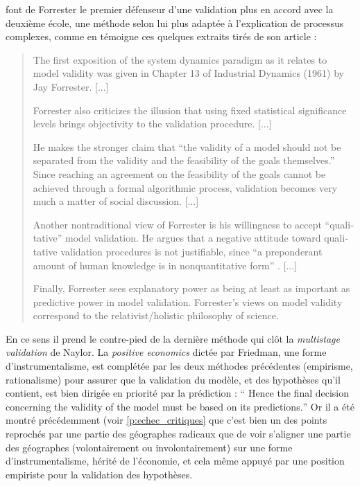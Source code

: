 \textcite{Barlas1990} font de Forrester le premier défenseur d'une validation plus en accord avec la deuxième école, une méthode selon lui plus adaptée à l'explication de processus complexes, comme en témoigne ces quelques extraits tirés de son article :

\foreignblockquote{english}[\cite{Barlas1990}]{The first exposition of the system dynamics paradigm as it relates to model validity was given in Chapter 13 of Industrial Dynamics (1961) by Jay Forrester. [...]

Forrester also criticizes the illusion that using fixed statistical significance levels brings objectivity to the validation procedure. [...]

He makes the stronger claim that \foreignquote{english}{the validity of a model should not be separated from the validity and the feasibility of the goals themselves.} Since reaching an agreement on the feasibility of the goals cannot be achieved through a formal algorithmic process, validation becomes very much a matter of social discussion. [...]

Another nontraditional view of Forrester is his willingness to accept \foreignquote{english}{qualitative} model validation. He argues that a negative attitude toward qualitative validation procedures is not justifiable, since \foreignquote{english}{a preponderant amount of human knowledge is in nonquantitative form} \autocite[128]{Forrester1961}. [...]

Finally, Forrester sees explanatory power as being at least as important as predictive power in model validation. Forrester’s views on model validity correspond to the relativist/holistic philosophy of science. }

En ce sens il prend le contre-pied de la dernière méthode qui clôt la \textit{multistage validation} de Naylor. La \textit{positive economics} dictée par Friedman, une forme d'instrumentalisme, est complétée par les deux méthodes précédentes (empirisme, rationalisme) pour assurer que la validation du modèle, et des hypothèses qu'il contient, est bien dirigée en priorité par la prédiction : \foreignquote{english}{ Hence the final decision concerning the validity of the model must be based on its predictions.} \autocite[97]{Naylor1967} Or il a été montré précédemment (voir \ref{p:echec_critiques} que c'est bien un des points reprochés par une partie des géographes radicaux que de voir s'aligner une partie des géographes (volontairement ou involontairement) sur une forme d'instrumentalisme, hérité de l'économie, et cela même appuyé par une position empiriste pour la validation des hypothèses.

